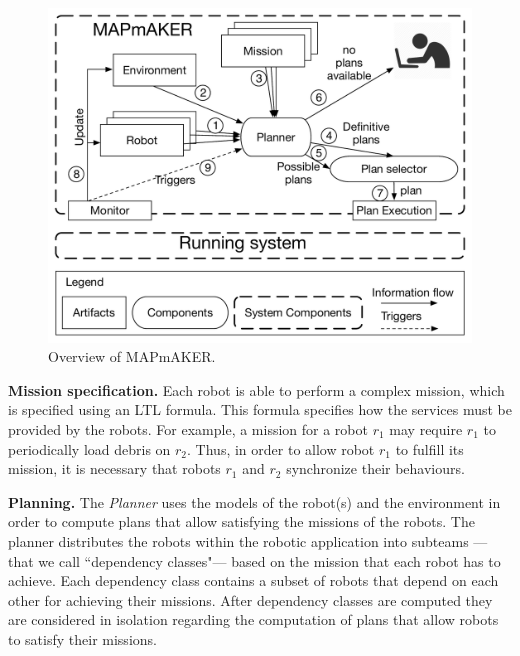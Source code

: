 \begin{figure}[t]
\begin{center}
\includegraphics[width=1\linewidth]{Figures/MAPmAKER.pdf}
\caption{Overview of  MAPmAKER.}
\label{fig:overview}
\vspace{-.5cm}
\end{center}
\end{figure}




\textbf{Mission specification.}
Each robot is able to perform a complex mission, which is specified using an LTL formula.
This formula specifies how the services must be provided by the robots.
For example, a mission for a robot $r_1$ may require $r_1$ to  periodically load debris on $r_2$.
Thus, in order to allow robot $r_1$ to fulfill its mission, it is necessary that robots $r_1$ and $r_2$ synchronize their behaviours.





\textbf{Planning.} 
The \emph{Planner} uses the models of the robot(s) and the environment in order to compute plans that allow satisfying the missions of the robots.
The planner distributes the robots within the robotic application into subteams ---that we call ``dependency classes"--- based on the mission that each robot has to achieve.
Each dependency class contains a subset of robots that depend on each other for achieving their missions.
After  dependency classes are computed they are considered in isolation regarding the computation of plans that allow robots to satisfy their missions.

